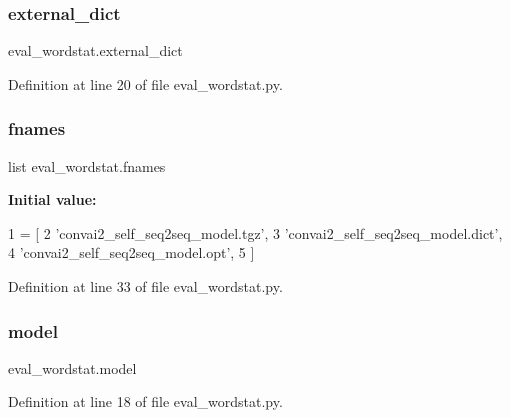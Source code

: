\subsubsection{\texorpdfstring{external\+\_\+dict}{external\_dict}}
{\footnotesize\ttfamily eval\+\_\+wordstat.\+external\+\_\+dict}



Definition at line 20 of file eval\+\_\+wordstat.\+py.

\mbox{\label{namespaceeval__wordstat_a9b6a657068e17305f2ecfaabb2e1f4e1}} 
\subsubsection{\texorpdfstring{fnames}{fnames}}
{\footnotesize\ttfamily list eval\+\_\+wordstat.\+fnames}

{\bfseries Initial value\+:}
\begin{DoxyCode}
1 =  [
2             \textcolor{stringliteral}{'convai2\_self\_seq2seq\_model.tgz'},
3             \textcolor{stringliteral}{'convai2\_self\_seq2seq\_model.dict'},
4             \textcolor{stringliteral}{'convai2\_self\_seq2seq\_model.opt'},
5         ]
\end{DoxyCode}


Definition at line 33 of file eval\+\_\+wordstat.\+py.

\mbox{\label{namespaceeval__wordstat_aae7b83a7fa256a49dcc6978b83f55ded}} 
\subsubsection{\texorpdfstring{model}{model}}
{\footnotesize\ttfamily eval\+\_\+wordstat.\+model}



Definition at line 18 of file eval\+\_\+wordstat.\+py.

\mbox{\label{namespaceeval__wordstat_af9acf373a29cffbdc88bf271775d49c3}} 
